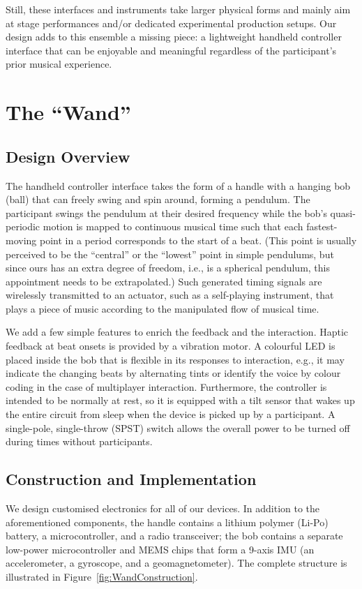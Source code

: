 \documentclass[manuscript,review]{acmart}
\begin{document}
Still, these interfaces and instruments take larger physical forms and mainly aim at stage performances and/or dedicated experimental production setups. Our design adds to this ensemble a missing piece: a lightweight handheld controller interface that can be enjoyable and meaningful regardless of the participant's prior musical experience.

\section{The ``Wand''}

\subsection{Design Overview}
The handheld controller interface takes the form of a handle with a hanging bob (ball) that can freely swing and spin around, forming a pendulum. The participant swings the pendulum at their desired frequency while the bob's quasi-periodic motion is mapped to continuous musical time such that each fastest-moving point in a period corresponds to the start of a beat. (This point is usually perceived to be the ``central'' or the ``lowest'' point in simple pendulums, but since ours has an extra degree of freedom, i.e., is a spherical pendulum, this appointment needs to be extrapolated.) Such generated timing signals are wirelessly transmitted to an actuator, such as a self-playing instrument, that plays a piece of music according to the manipulated flow of musical time.

We add a few simple features to enrich the feedback and the interaction. Haptic feedback at beat onsets is provided by a vibration motor. A colourful LED is placed inside the bob that is flexible in its responses to interaction, e.g., it may indicate the changing beats by alternating tints or identify the voice by colour coding in the case of multiplayer interaction. Furthermore, the controller is intended to be normally at rest, so it is equipped with a tilt sensor that wakes up the entire circuit from sleep when the device is picked up by a participant. A single-pole, single-throw (SPST) switch allows the overall power to be turned off during times without participants.

\subsection{Construction and Implementation}
We design customised electronics for all of our devices. In addition to the aforementioned components, the handle contains a lithium polymer (Li-Po) battery, a microcontroller, and a radio transceiver; the bob contains a separate low-power microcontroller and MEMS chips that form a 9-axis IMU (an accelerometer, a gyroscope, and a geomagnetometer). The complete structure is illustrated in Figure~\ref{fig:WandConstruction}.
\end{document}
